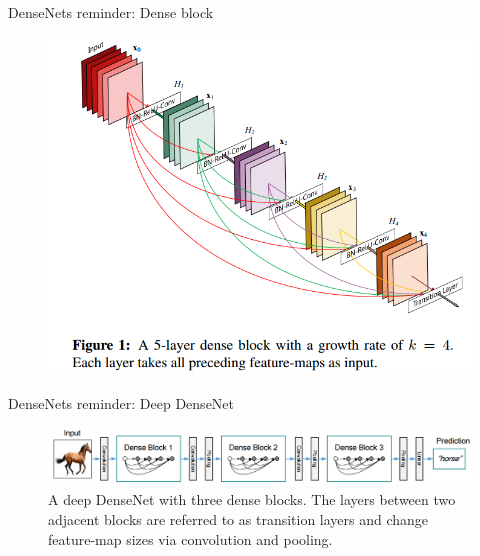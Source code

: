 \documentclass{beamer}
\begin{document}
\begin{frame}{DenseNets reminder: Dense block }

\begin{figure}[h]
\includegraphics[width=\textwidth]{img/denseBlock}
\end{figure}

\end{frame}
\begin{frame}{DenseNets reminder: Deep DenseNet }

\begin{figure}[h]
\includegraphics[width=\textwidth]{img/denseNet}
\caption{A deep DenseNet with three dense blocks. The layers between two adjacent blocks are referred to as transition layers and change
feature-map sizes via convolution and pooling. \cite{cit:densenet}}
\end{figure}

\end{frame}
\end{document}
